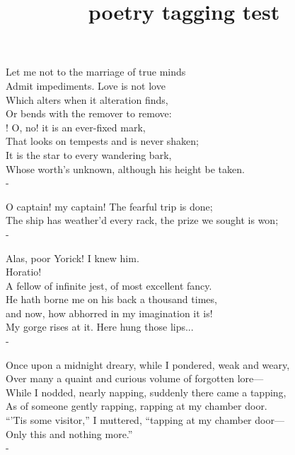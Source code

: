 \documentclass{article}
\title{poetry tagging test}
\begin{document}
\begin{poem}
Let me not to the marriage of true minds \\
\hin Admit impediments. Love is not love \\
Which alters when it alteration finds, \\
\hin Or bends with the remover to remove: \\!
O, no! it is an ever-fixed mark, \\
\hin That looks on tempests and is never shaken; \\
It is the star to every wandering bark, \\
\hin Whose worth's unknown, although his height be taken. \\-
\end{poem}

\bgroup
{}
\begin{poem}
O captain! my captain! The fearful trip is done; \\
The ship has weather'd every rack, the prize we sought is won;\\-
\end{poem}
\egroup

\bgroup
{}
\settowidth{\poemhinwd}{Alas, poor Yorick! I knew him. }
\begin{poem}
Alas, poor Yorick! I knew him.\\
\hin Horatio! \\
\setlength{\poemhinwd}{2em}
A fellow of infinite jest, of most excellent fancy. \\
\hin He hath borne me on his back a thousand times, \\
and now, how abhorred in my imagination it is! \\
My gorge rises at it. Here hung those lips...\\-
\end{poem}
\egroup

\bgroup
\setcounter{poemindentevery}{3}
\setcounter{poemlinenumsevery}{2}
\begin{poem}
Once upon a midnight dreary, while I pondered, weak and weary,\\
Over many a quaint and curious volume of forgotten lore---\\
While I nodded, nearly napping, suddenly there came a tapping,\\
As of someone gently rapping, rapping at my chamber door.\\
``'Tis some visitor,'' I muttered, ``tapping at my chamber door---\\
Only this and nothing more.''\\-
\end{poem}
\egroup
\end{document}
